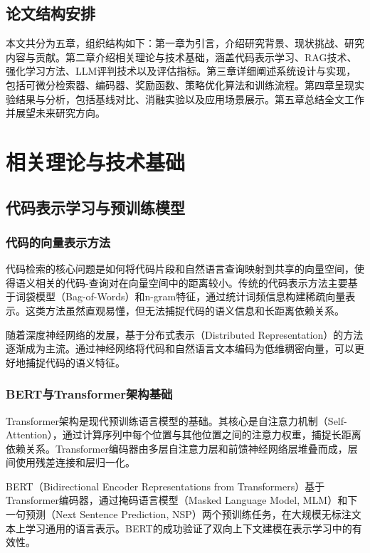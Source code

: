 \documentclass[
    fontset = win, %
  ]{njuthesis}
\begin{document}
\section{论文结构安排}

本文共分为五章，组织结构如下：第一章为引言，介绍研究背景、现状挑战、研究内容与贡献。第二章介绍相关理论与技术基础，涵盖代码表示学习、RAG技术、强化学习方法、LLM评判技术以及评估指标。第三章详细阐述系统设计与实现，包括可微分检索器、编码器、奖励函数、策略优化算法和训练流程。第四章呈现实验结果与分析，包括基线对比、消融实验以及应用场景展示。第五章总结全文工作并展望未来研究方向。


\chapter{相关理论与技术基础}

\section{代码表示学习与预训练模型}

\subsection{代码的向量表示方法}

代码检索的核心问题是如何将代码片段和自然语言查询映射到共享的向量空间，使得语义相关的代码-查询对在向量空间中的距离较小。传统的代码表示方法主要基于词袋模型（Bag-of-Words）和n-gram特征，通过统计词频信息构建稀疏向量表示。这类方法虽然直观易懂，但无法捕捉代码的语义信息和长距离依赖关系。

随着深度神经网络的发展，基于分布式表示（Distributed Representation）的方法逐渐成为主流。通过神经网络将代码和自然语言文本编码为低维稠密向量，可以更好地捕捉代码的语义特征。

\subsection{BERT与Transformer架构基础}

Transformer架构\cite{transformer2017}是现代预训练语言模型的基础。其核心是自注意力机制（Self-Attention），通过计算序列中每个位置与其他位置之间的注意力权重，捕捉长距离依赖关系。Transformer编码器由多层自注意力层和前馈神经网络层堆叠而成，层间使用残差连接和层归一化。

BERT\cite{bert2019}（Bidirectional Encoder Representations from Transformers）基于Transformer编码器，通过掩码语言模型（Masked Language Model, MLM）和下一句预测（Next Sentence Prediction, NSP）两个预训练任务，在大规模无标注文本上学习通用的语言表示。BERT的成功验证了双向上下文建模在表示学习中的有效性。
\end{document}
